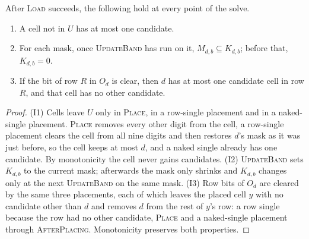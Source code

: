 \begin{lemma}[invariants]
\label{lem:invariants}
After \textsc{Load} succeeds, the following hold at every point of the solve.
\begin{enumerate}
\item[(I1)] A cell not in $U$ has at most one candidate.
\item[(I2)] For each mask, once \textsc{UpdateBand} has run on it, $M_{d,b}\subseteq K_{d,b}$; before that,
  $K_{d,b}=0$.
\item[(I3)] If the bit of row $R$ in $O_d$ is clear, then $d$ has at most one candidate cell in row $R$, and that cell
  has no other candidate.
\end{enumerate}
\end{lemma}
\begin{proof}
(I1) Cells leave $U$ only in \textsc{Place}, in a row-single placement and in a naked-single placement. \textsc{Place}
removes every other digit from the cell, a row-single placement clears the cell from all nine digits and then restores $d$'s mask as it was just before, so
the cell keeps at most $d$, and a naked single already has one candidate. By monotonicity the cell never gains candidates.
(I2) \textsc{UpdateBand} sets $K_{d,b}$ to the current mask; afterwards the mask only shrinks and $K_{d,b}$ changes only
at the next \textsc{UpdateBand} on the same mask. (I3) Row bits of $O_d$ are cleared by the same three placements, each
of which leaves the placed cell $y$ with no candidate other than $d$ and removes $d$ from the rest of $y$'s row: a row
single because the row had no other candidate, \textsc{Place} and a naked-single placement through
\textsc{AfterPlacing}. Monotonicity preserves both properties.
\end{proof}


